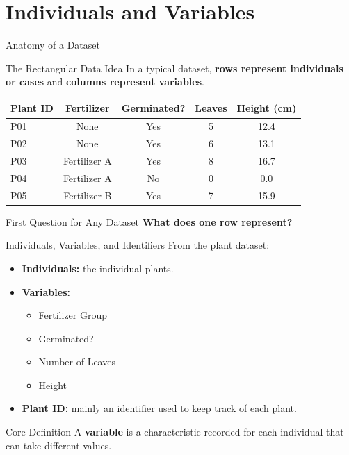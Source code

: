 \documentclass[aspectratio=169]{beamer}
\begin{document}
\section{Individuals and Variables}

\begin{frame}{Anatomy of a Dataset}
  \begin{block}{The Rectangular Data Idea}
    In a typical dataset, \textbf{rows represent individuals or cases} and \textbf{columns represent variables}.
  \end{block}
  \vspace{0.15cm}
  \begin{table}
    \centering
    \small
    \begin{tabular}{lcccc}
      \toprule
      \textbf{Plant ID} & \textbf{Fertilizer} & \textbf{Germinated?} & \textbf{Leaves} & \textbf{Height (cm)} \\
      \midrule
      P01 & None & Yes & 5 & 12.4 \\
      P02 & None & Yes & 6 & 13.1 \\
      P03 & Fertilizer A & Yes & 8 & 16.7 \\
      P04 & Fertilizer A & No & 0 & 0.0 \\
      P05 & Fertilizer B & Yes & 7 & 15.9 \\
      \bottomrule
    \end{tabular}
  \end{table}
  \begin{alertblock}{First Question for Any Dataset}
    \textbf{What does one row represent?}
  \end{alertblock}
\end{frame}

\begin{frame}{Individuals, Variables, and Identifiers}
  From the plant dataset:
  \begin{itemize}
    \item \textbf{Individuals:} the individual plants.
    \item \textbf{Variables:}
    \begin{itemize}
      \item Fertilizer Group
      \item Germinated?
      \item Number of Leaves
      \item Height
    \end{itemize}
    \item \textbf{Plant ID:} mainly an identifier used to keep track of each plant.
  \end{itemize}
  \vspace{0.2cm}
  \begin{block}{Core Definition}
    A \textbf{variable} is a characteristic recorded for each individual that can take different values.
  \end{block}
\end{frame}
\end{document}
